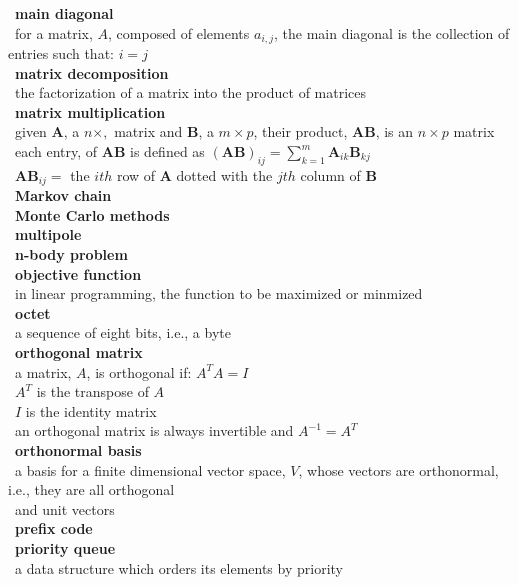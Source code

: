 \documentclass[10pt,letterpaper]{scrartcl}
\newcommand{\tbul}{\textbullet}
\newcommand{\tend}{\>\textendash}
\newcommand{\tasc}{\>\>\textasteriskcentered}
\begin{document}
\begin{tabbing}
\tbul\ \textbf{main diagonal} \\
\tend\ for a matrix, $A$, composed of elements $a_{i,j}$, the main diagonal is the collection of entries such that: $i=j$ \\
\tbul\ \textbf{matrix decomposition} \\
\tend\ the factorization of a matrix into the product of matrices \\
\tbul\ \textbf{matrix multiplication} \\
\tend\ given $\mathbf{A}$, a $n\times ,$ matrix and $\mathbf{B}$, a $m\times p$, their product, $\mathbf{AB}$, is an $n\times p$ matrix\\
\tend\ each entry, of $\mathbf{AB}$ is defined as $\displaystyle (\mathbf{AB})_{ij} = \sum_{k=1}^{m}\mathbf{A}_{ik}\mathbf{B}_{kj}$ \\
\tend\ $\mathbf{AB}_{ij}=$ the $ith$ row of $\mathbf{A}$ dotted with the $jth$ column of $\mathbf{B}$ \\
\tbul\ \textbf{Markov chain} \\
\tbul\ \textbf{Monte Carlo methods} \\
\tbul\ \textbf{multipole} \\
\tbul\ \textbf{n-body problem} \\
\tbul\ \textbf{objective function} \\
\tend\ in linear programming, the function to be maximized or minmized \\
\tbul\ \textbf{octet} \\ 
\tend\ a sequence of eight bits, i.e., a byte \\
\tbul\ \textbf{orthogonal matrix} \\
\tend\ a matrix, $A$, is orthogonal if: $A^TA=I$ \\
\tasc\ $A^T$ is the transpose of $A$ \\
\tasc\ $I$ is the identity matrix \\
\tend\ an orthogonal matrix is always invertible and $A^{-1} = A^T$ \\
\tbul\ \textbf{orthonormal basis} \\
\tend\ a basis for a finite dimensional vector space, $V$, whose vectors are orthonormal, i.e., they are all orthogonal \\ \>\ and unit vectors \\
\tbul\ \textbf{prefix code} \\
\tbul\ \textbf{priority queue} \\
\tend\ a data structure which orders its elements by priority \\

\end{tabbing}
\end{document}
